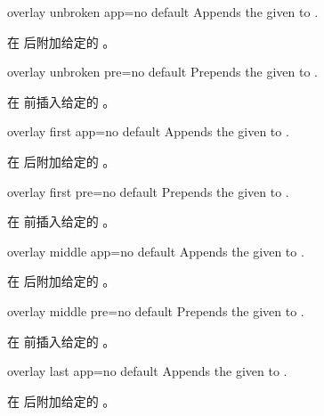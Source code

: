 \begin{docTcbKey}{overlay unbroken app}{=}{no default}
Appends the given  to .

在  后附加给定的 。
\end{docTcbKey}

\begin{docTcbKey}{overlay unbroken pre}{=}{no default}
Prepends the given  to .

在  前插入给定的 。
\end{docTcbKey}

\begin{docTcbKey}{overlay first app}{=}{no default}
Appends the given  to .

在  后附加给定的 。
\end{docTcbKey}

\begin{docTcbKey}{overlay first pre}{=}{no default}
Prepends the given  to .

在  前插入给定的 。
\end{docTcbKey}

\begin{docTcbKey}{overlay middle app}{=}{no default}
Appends the given  to .

在  后附加给定的 。
\end{docTcbKey}

\begin{docTcbKey}{overlay middle pre}{=}{no default}
Prepends the given  to .

在  前插入给定的 。
\end{docTcbKey}

\begin{docTcbKey}{overlay last app}{=}{no default}
Appends the given  to .

在  后附加给定的 。
\end{docTcbKey}

